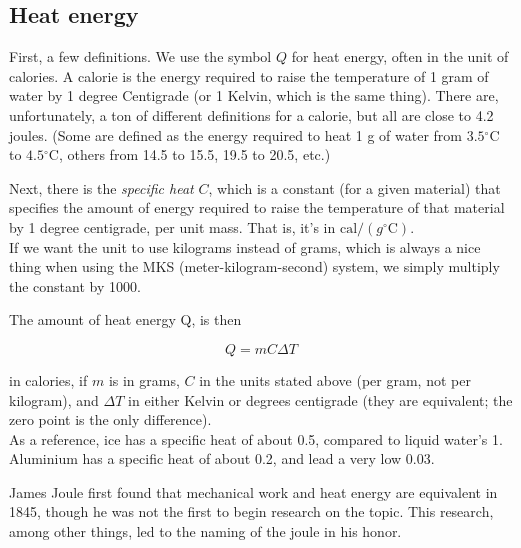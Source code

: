 \subsection{Heat energy}

First, a few definitions. We use the symbol $Q$ for heat energy, often in the unit of calories. A calorie is the energy required to raise the temperature of 1 gram of water by 1 degree Centigrade (or 1 Kelvin, which is the same thing). There are, unfortunately, a ton of different definitions for a calorie, but all are close to 4.2 joules. (Some are defined as the energy required to heat 1 g of water from $3.5 {}^\circ$C to $4.5 {}^\circ$C, others from 14.5 to 15.5, 19.5 to 20.5, etc.)

Next, there is the \emph{specific heat} $C$, which is a constant (for a given material) that specifies the amount of energy required to raise the temperature of that material by 1 degree centigrade, per unit mass. That is, it's in $\text{cal}/(g {}^\circ\text{C})$.\\
If we want the unit to use kilograms instead of grams, which is always a nice thing when using the MKS (meter-kilogram-second) system, we simply multiply the constant by 1000.

The amount of heat energy Q, is then

\begin{equation}
Q = m C \Delta T
\end{equation}

in calories, if $m$ is in grams, $C$ in the units stated above (per gram, not per kilogram), and $\Delta T$ in either Kelvin or degrees centigrade (they are equivalent; the zero point is the only difference).\\
As a reference, ice has a specific heat of about 0.5, compared to liquid water's 1. Aluminium has a specific heat of about 0.2, and lead a very low 0.03.

James Joule first found that mechanical work and heat energy are equivalent in 1845, though he was not the first to begin research on the topic. This research, among other things, led to the naming of the joule in his honor.


